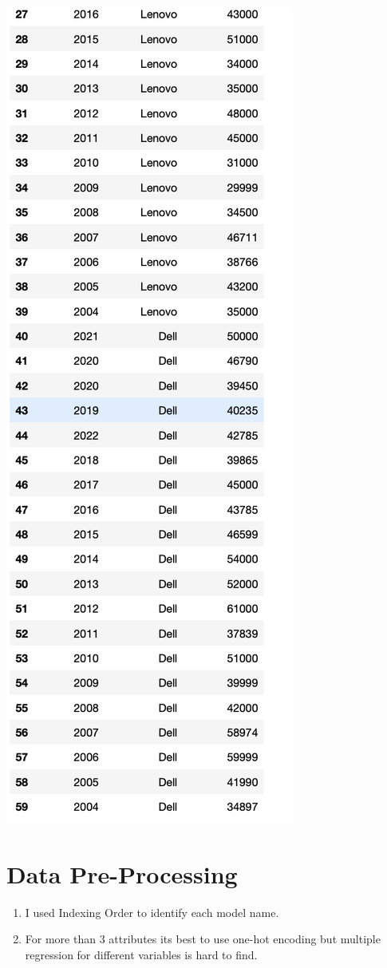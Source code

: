 \documentclass{article}
\begin{document}
\includegraphics[scale=0.6]{images/2.png}

\section{Data Pre-Processing}
\begin{enumerate}
	\item I used Indexing Order to identify each model name.
	\item For more than 3 attributes its best to use one-hot encoding but multiple regression for different variables is hard to find.
\end{enumerate}
\end{document}
